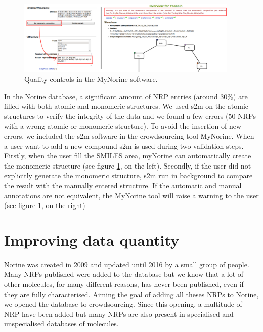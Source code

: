 \documentclass[long, final]{jobim2017}
\begin{document}
 \begin{figure}
   \begin{center}
     \includegraphics[width=400px]{figs/warnings.png}
   \end{center}
   \caption{Quality controls in the MyNorine software.}
   \label{fig:warnings}
 \end{figure}

In the Norine database, a significant amount of NRP entries (around 30\%) are filled with both atomic and monomeric structures.
We used s2m on the atomic structures to verify the integrity of the data and we found a few errors (50 NRPs with a wrong atomic or monomeric structure).
To avoid the insertion of new errors, we included the s2m software in the crowdsourcing tool MyNorine.
When a user want to add a new compound s2m is used during two validation steps.
Firstly, when the user fill the SMILES area, myNorine can automatically create the monomeric structure (see figure \ref{fig:warnings}, on the left).
Secondly, if the user did not explicitly generate the monomeric structure, s2m run in background to compare the result with the manually entered structure.
If the automatic and manual annotations are not equivalent, the MyNorine tool will raise a warning to the user (see figure \ref{fig:warnings}, on the right)


\section{Improving data quantity}

Norine was created in 2009 and updated until 2016 by a small group of people.
Many NRPs published were added to the database but we know that a lot of other molecules, for many different reasons, has never been published, even if they are fully characterised.
Aiming the goal of adding all theses NRPs to Norine, we opened the database to crowdsourcing.
Since this opening, a multitude of NRP have been added but many NRPs are also present in specialised and unspecialised databases of molecules.
\end{document}
